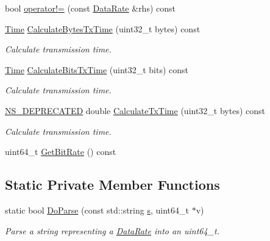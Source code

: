 \begin{DoxyCompactItemize}
\item 
bool \hyperlink{classns3_1_1DataRate_abbe54fd13b5a1ba6f01c6f3c972582e0}{operator!=} (const \hyperlink{classns3_1_1DataRate}{Data\+Rate} \&rhs) const 
\item 
\hyperlink{classns3_1_1Time}{Time} \hyperlink{classns3_1_1DataRate_a5daa3d3b37b7df8bb75d94a6540fd17e}{Calculate\+Bytes\+Tx\+Time} (uint32\+\_\+t bytes) const 
\begin{DoxyCompactList}\small\item\em Calculate transmission time. \end{DoxyCompactList}\item 
\hyperlink{classns3_1_1Time}{Time} \hyperlink{classns3_1_1DataRate_ae07595a1bd07599c0008ca86e2abeb0c}{Calculate\+Bits\+Tx\+Time} (uint32\+\_\+t bits) const 
\begin{DoxyCompactList}\small\item\em Calculate transmission time. \end{DoxyCompactList}\item 
\hyperlink{deprecated_8h_a771fbc06c05c32655c757f56492d98c5}{N\+S\+\_\+\+D\+E\+P\+R\+E\+C\+A\+T\+ED} double \hyperlink{classns3_1_1DataRate_ae14a4806b20b7de4b8b45880db3af9a3}{Calculate\+Tx\+Time} (uint32\+\_\+t bytes) const 
\begin{DoxyCompactList}\small\item\em Calculate transmission time. \end{DoxyCompactList}\item 
uint64\+\_\+t \hyperlink{classns3_1_1DataRate_a88e27dcc6e633584dac99fa5988612bc}{Get\+Bit\+Rate} () const 
\end{DoxyCompactItemize}
\subsection*{Static Private Member Functions}
\begin{DoxyCompactItemize}
\item 
static bool \hyperlink{classns3_1_1DataRate_a2714f3be344bbae7ace310b1a8412ed8}{Do\+Parse} (const std\+::string \hyperlink{generate__test__data__lte__sinr_8m_ad83eeb3a142285d1243a08c6b7026df8}{s}, uint64\+\_\+t $\ast$v)
\begin{DoxyCompactList}\small\item\em Parse a string representing a \hyperlink{classns3_1_1DataRate}{Data\+Rate} into an uint64\+\_\+t. \end{DoxyCompactList}\end{DoxyCompactItemize}
